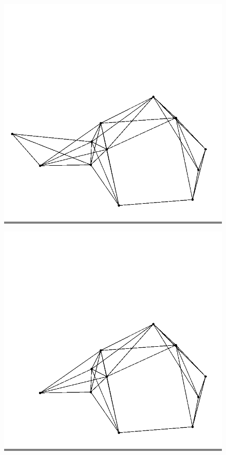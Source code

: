 \documentclass{article}
\begin{document}
\begin{figure}
\begin{minipage}{0.2\textwidth}
            \end{minipage}
            \vskip 0.1in
            \begin{minipage}{0.2\textwidth}
            \colorbox{gray}{\includegraphics[width=\linewidth]{./images/slvo-8.png}}
            \end{minipage}
            \hspace{\fill}
            \begin{minipage}{0.2\textwidth}
            \colorbox{gray}{\includegraphics[width=\linewidth]{./images/slvo-9.png}}

\end{minipage}
\end{figure}
\end{document}
